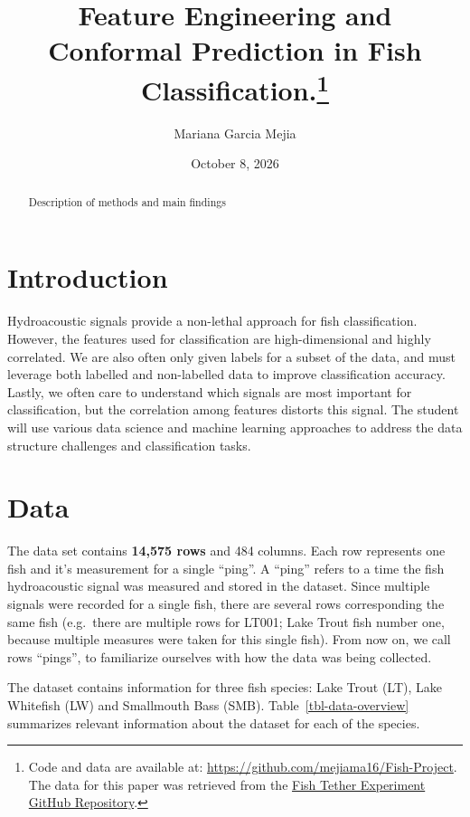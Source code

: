 \documentclass[
  letterpaper,
  DIV=11,
  numbers=noendperiod]{scrartcl}
\title{Feature Engineering and Conformal Prediction in Fish
Classification.\thanks{Code and data are available at:
\url{https://github.com/mejiama16/Fish-Project}. The data for this paper
was retrieved from the
\href{https://github.com/WidebandPingFest/FishTetherExperiment}{Fish
Tether Experiment GitHub Repository}.}}
\author{Mariana Garcia Mejia}
\date{October 8, 2026}
\begin{document}
\maketitle
\begin{abstract}
Description of methods and main findings
\end{abstract}
\ifdefined\Shaded\renewenvironment{Shaded}{\begin{tcolorbox}[boxrule=0pt, breakable, frame hidden, borderline west={3pt}{0pt}{shadecolor}, enhanced, interior hidden, sharp corners]}{\end{tcolorbox}}\fi

\hypertarget{sec-introduction}{%
\section{Introduction}\label{sec-introduction}}

Hydroacoustic signals provide a non-lethal approach for fish
classification. However, the features used for classification are
high-dimensional and highly correlated. We are also often only given
labels for a subset of the data, and must leverage both labelled and
non-labelled data to improve classification accuracy. Lastly, we often
care to understand which signals are most important for classification,
but the correlation among features distorts this signal. The student
will use various data science and machine learning approaches to address
the data structure challenges and classification tasks.

\hypertarget{sec-data}{%
\section{Data}\label{sec-data}}

The data set contains \textbf{14,575 rows} and 484 columns. Each row
represents one fish and it's measurement for a single ``ping''. A
``ping'' refers to a time the fish hydroacoustic signal was measured and
stored in the dataset. Since multiple signals were recorded for a single
fish, there are several rows corresponding the same fish (e.g.~there are
multiple rows for LT001; Lake Trout fish number one, because multiple
measures were taken for this single fish). From now on, we call rows
``pings'', to familiarize ourselves with how the data was being
collected.

The dataset contains information for three fish species: Lake Trout
(LT), Lake Whitefish (LW) and Smallmouth Bass (SMB).
Table~\ref{tbl-data-overview} summarizes relevant information about the
dataset for each of the species.
\end{document}
